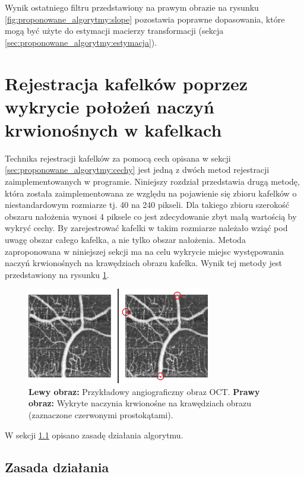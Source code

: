 Wynik ostatniego filtru przedstawiony na prawym obrazie na rysunku \ref{fig:proponowane_algorytmy:slope} pozostawia poprawne dopasowania, które mogą być użyte do estymacji macierzy transformacji (sekcja \ref{sec:proponowane_algorytmy:estymacja}).

\section{Rejestracja kafelków poprzez wykrycie położeń naczyń krwionośnych w kafelkach}
\label{sec:proponowane_algorytmy:depth_first_search}

Technika rejestracji kafelków za pomocą cech opisana w sekcji \ref{sec:proponowane_algorytmy:cechy} jest jedną z dwóch metod rejestracji zaimplementowanych w programie. Niniejszy rozdział przedstawia drugą metodę, która została zaimplementowana ze względu na pojawienie się zbioru kafelków o niestandardowym rozmiarze tj. 40 na 240 pikseli. Dla takiego zbioru szerokość obszaru nałożenia wynosi 4 piksele co jest zdecydowanie zbyt małą wartością by wykryć cechy. By zarejestrować kafelki w takim rozmiarze należało wziąć pod uwagę obszar całego kafelka, a nie tylko obszar nałożenia. Metoda zaproponowana w niniejszej sekcji ma na celu wykrycie miejsc występowania naczyń krwionośnych na krawędziach obrazu kafelka. Wynik tej metody jest przedstawiony na rysunku \ref{fig:proponowane_algorytmy:paths_detected}.

\begin{figure}[H]
  \centering
  \includegraphics[width=8cm]{gfx/paths_detected}
  \caption{\textbf{Lewy obraz:} Przykładowy angiograficzny obraz OCT. \textbf{Prawy obraz:} Wykryte naczynia krwionośne na krawędziach obrazu (zaznaczone czerwonymi prostokątami).}
  \label{fig:proponowane_algorytmy:paths_detected}
\end{figure}

W sekcji \ref{sec:proponowane_algorytmy:zasada_dzialania} opisano zasadę działania algorytmu.

\subsection{Zasada działania}
\label{sec:proponowane_algorytmy:zasada_dzialania}

